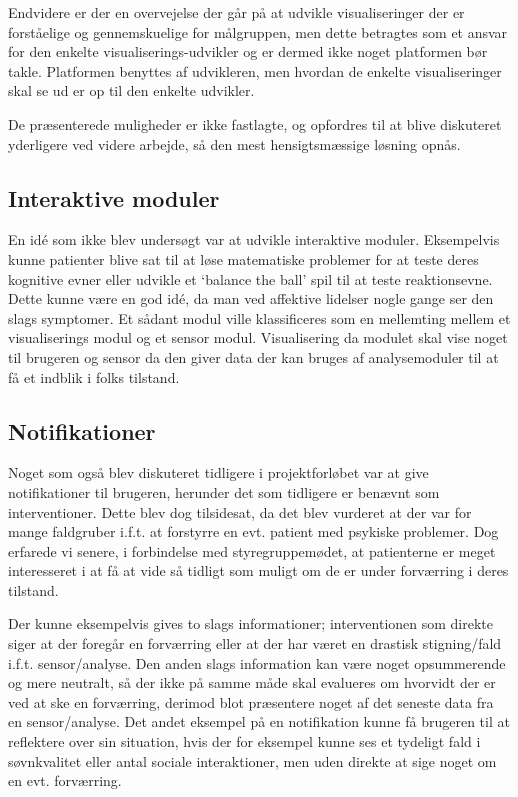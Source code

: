 Endvidere er der en overvejelse der går på at udvikle visualiseringer der er forståelige og gennemskuelige for målgruppen, men dette betragtes som et ansvar for den enkelte visualiserings-udvikler og er dermed ikke noget platformen bør takle.
Platformen benyttes af udvikleren, men hvordan de enkelte visualiseringer skal se ud er op til den enkelte udvikler.

De præsenterede muligheder er ikke fastlagte, og opfordres til at blive diskuteret yderligere ved videre arbejde, så den mest hensigtsmæssige løsning opnås.

\subsection{Interaktive moduler}
En idé som ikke blev undersøgt var at udvikle interaktive moduler.
Eksempelvis kunne patienter blive sat til at løse matematiske problemer for at teste deres kognitive evner eller udvikle et `balance the ball' spil til at teste reaktionsevne.
Dette kunne være en god idé, da man ved affektive lidelser nogle gange ser den slags symptomer.
Et sådant modul ville klassificeres som en mellemting mellem et visualiserings modul og et sensor modul.
Visualisering da modulet skal vise noget til brugeren og sensor da den giver data der kan bruges af analysemoduler til at få et indblik i folks tilstand.

\subsection{Notifikationer}
Noget som også blev diskuteret tidligere i projektforløbet var at give notifikationer til brugeren, herunder det som tidligere er benævnt som interventioner.
Dette blev dog tilsidesat, da det blev vurderet at der var for mange faldgruber i.f.t. at forstyrre en evt. patient med psykiske problemer.
Dog erfarede vi senere, i forbindelse med styregruppemødet, at patienterne er meget interesseret i at få at vide så tidligt som muligt om de er under forværring i deres tilstand.

Der kunne eksempelvis gives to slags informationer; interventionen som direkte siger at der foregår en forværring eller at der har været en drastisk stigning/fald i.f.t. sensor/analyse.
Den anden slags information kan være noget opsummerende og mere neutralt, så der ikke på samme måde skal evalueres om hvorvidt der er ved at ske en forværring, derimod blot præsentere noget af det seneste data fra en sensor/analyse.
Det andet eksempel på en notifikation kunne få brugeren til at reflektere over sin situation, hvis der for eksempel kunne ses et tydeligt fald i søvnkvalitet eller antal sociale interaktioner, men uden direkte at sige noget om en evt. forværring.

